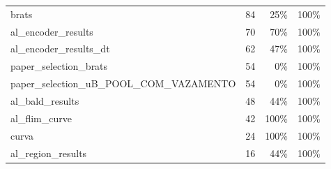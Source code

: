 \begin{tabular}{lrrr}
brats & 84 & 25\% & 100\% \\
al\_encoder\_results & 70 & 70\% & 100\% \\
al\_encoder\_results\_dt & 62 & 47\% & 100\% \\
paper\_selection\_brats & 54 & 0\% & 100\% \\
paper\_selection\_uB\_POOL\_COM\_VAZAMENTO & 54 & 0\% & 100\% \\
al\_bald\_results & 48 & 44\% & 100\% \\
al\_flim\_curve & 42 & 100\% & 100\% \\
curva & 24 & 100\% & 100\% \\
al\_region\_results & 16 & 44\% & 100\% \\
\hline
\end{tabular}
